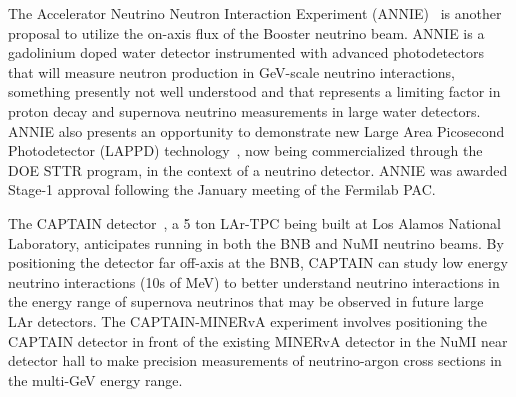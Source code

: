 The Accelerator Neutrino Neutron Interaction Experiment
(ANNIE)~\cite{Anghel:2014ynd} is another proposal to utilize the
on-axis flux of the Booster neutrino beam.  ANNIE is a gadolinium
doped water detector instrumented with advanced photodetectors that
will measure neutron production in GeV-scale neutrino interactions,
something presently not well understood and that represents a limiting
factor in proton decay and supernova neutrino measurements in large
water detectors.  ANNIE also presents an opportunity to demonstrate
new Large Area Picosecond Photodetector (LAPPD)
technology~\cite{lappd}, now being commercialized through the DOE STTR
program, in the context of a neutrino detector. ANNIE was awarded
Stage-1 approval following the January meeting of the Fermilab PAC.


The CAPTAIN detector~\cite{Berns:2013usa}, a 5 ton LAr-TPC being built
at Los Alamos National Laboratory, anticipates running in both the BNB
and NuMI neutrino beams.  By positioning the detector far off-axis at
the BNB, CAPTAIN can study low energy neutrino interactions (10s of
MeV) to better understand neutrino interactions in the energy range of
supernova neutrinos that may be observed in future large LAr
detectors.  The CAPTAIN-MINERvA experiment involves positioning the
CAPTAIN detector in front of the existing MINERvA detector in the NuMI
near detector hall to make precision measurements of neutrino-argon
cross sections in the multi-GeV energy range.



